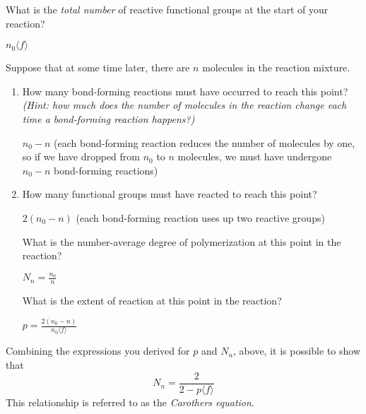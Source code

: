 \begin{activity}
\begin{ctqs}
		What is the \emph{total number} of reactive functional groups at the start of your reaction?
	
			\begin{solution}[1in]
				$n_0 \langle f \rangle$
			\end{solution}
			
	\question Suppose that at some time later, there are $n$ molecules in the reaction mixture.
	
		\begin{enumerate}
		
			\item How many bond-forming reactions must have occurred to reach this point?  \emph{(Hint: how much does the number of molecules in the reaction change each time a bond-forming reaction happens?)}
			
				\begin{solution}[0.65in]
					$n_0 - n$ (each bond-forming reaction reduces the number of molecules by one, so if we have dropped from $n_0$ to $n$ molecules, we must have undergone $n_0-n$ bond-forming reactions)
				\end{solution}
		
			\item How many functional groups must have reacted to reach this point?
			
				\begin{solution}[0.65in]
					$2(n_0-n)$ (each bond-forming reaction uses up two reactive groups)
				\end{solution}
			
			\question What is the number-average degree of polymerization at this point in the reaction?
			
				\begin{solution}[0.65in]
					$N_n = \frac{n_0}{n}$
				\end{solution}
			
			\question What is the extent of reaction at this point in the reaction?
			
				\begin{solution}[0.65in]
					$p = \frac{2(n_0-n)}{n_0\langle f \rangle}$
				\end{solution}
		
		\end{enumerate}
	
\end{ctqs}

\begin{infobox}
	Combining the expressions you derived for $p$ and $N_n$, above, it is possible to show that
	\begin{equation*}
		N_n = \frac{2}{2-p\langle f \rangle}
	\end{equation*}
	This relationship is referred to as the \emph{Carothers equation}.
\end{infobox}


\end{activity}
